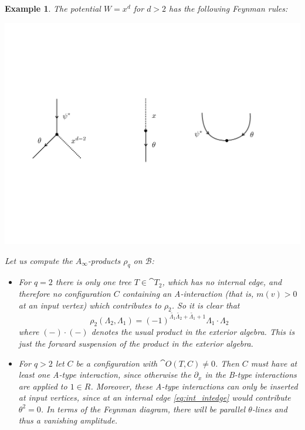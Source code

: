 \documentclass[english,letter paper,12pt,leqno]{article}
\theoremstyle{example}
\newtheorem{example}[theorem]{Example}
\numberwithin{equation}{section}
\def\be{\begin{equation}}
\def\ee{\end{equation}}
\begin{document}
\begin{example} The potential $W = x^d$ for $d > 2$ has the following Feynman rules:
\begin{center}
\includegraphics[scale=0.45]{dia9}
\end{center}
Let us compute the $A_\infty$-products $\rho_q$ on $\mathscr{B}$:
\begin{itemize}
\item For $q = 2$ there is only one tree $T \in \cat{T}_2$, which has no internal edge, and therefore no configuration $C$ containing an A-interaction (that is, $m(v) > 0$ at an input vertex) which contributes to $\rho_2$. So it is clear that
\be\label{eq:a_type_product}
\rho_2( \Lambda_2, \Lambda_1 ) = (-1)^{\widetilde{\Lambda_1} \widetilde{\Lambda_2} + \widetilde{\Lambda_1} + 1} \Lambda_1 \cdot \Lambda_2
\ee
where $(-) \cdot (-)$ denotes the usual product in the exterior algebra. This is just the forward suspension of the product in the exterior algebra.

\item For $q > 2$ let $C$ be a configuration with $\cat{O}(T,C) \neq 0$. Then $C$ must have at least one A-type interaction, since otherwise the $\partial_x$ in the B-type interactions are applied to $1 \in R$. Moreover, these A-type interactions can only be inserted at input vertices, since at an internal edge \eqref{eq:int_intedge} would contribute $\theta^2 = 0$. In terms of the Feynman diagram, there will be parallel $\theta$-lines and thus a vanishing amplitude.


\end{itemize}
\end{example}
\end{document}
